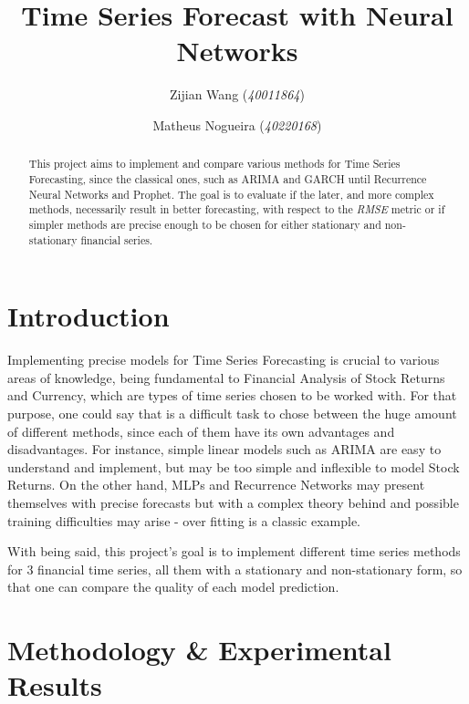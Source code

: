 \documentclass[10pt,twocolumn,letterpaper]{article}
\begin{document}
	\title{Time Series Forecast with Neural Networks}
	\author{Zijian Wang (\textit{40011864}) \and Matheus Nogueira (\textit{40220168})  }
	\maketitle
	
	\begin{abstract}
		This project aims to implement and compare various methods for Time Series Forecasting, since the classical ones, such as ARIMA and GARCH until Recurrence Neural Networks and Prophet. The goal is to evaluate if the later, and more complex methods, necessarily result in better forecasting, with respect to the \textit{RMSE} metric or if simpler methods are precise enough to be chosen for either stationary and non-stationary financial series.  
	\end{abstract}
	
	\section{Introduction}
	
	Implementing precise models for Time Series Forecasting is crucial to various areas of knowledge, being fundamental to Financial Analysis of Stock Returns and Currency, which are types of time series chosen to be worked with. For that purpose, one could say that is a difficult task to chose between the huge amount of different methods, since each of them have its own advantages and disadvantages. For instance, simple linear models such as ARIMA are easy to understand and implement, but may be too simple and inflexible to model Stock Returns. On the other hand, MLPs and Recurrence Networks may present themselves with precise forecasts but with a complex theory behind and possible training difficulties may arise - over fitting is a classic example.
	
	With being said, this project's goal is to implement different time series methods for 3 financial time series, all them with a stationary and non-stationary form, so that one can compare the quality of each model prediction.
	
	\section{Methodology \& Experimental Results}
	
\end{document}
